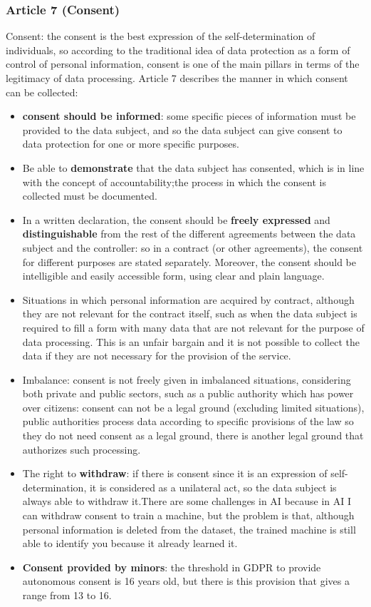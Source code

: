 \subsubsection{Article 7 (Consent)}
Consent: the consent is the best expression of the self-determination of individuals, so according to the traditional idea of data protection as a form of control of personal information, consent is one of the main pillars in terms of the legitimacy of data processing.
Article 7 describes the manner in which consent can be collected:
\begin{itemize}
    \item \textbf{consent should be informed}: some specific pieces of information must be provided to the data subject, and so the data subject can give consent to data protection for one or more specific purposes.
    \item Be able to \textbf{demonstrate} that the data subject has consented, which is in line with the concept of accountability;the process in which the consent is collected must be documented.
    \item In a written declaration, the consent should be \textbf{freely expressed} and \textbf{distinguishable} from the rest of the different agreements between the data subject and the controller: so in a contract (or other agreements), the consent for different purposes are stated separately. Moreover, the consent should be intelligible and easily accessible form, using clear and plain language.
    \item  Situations in which personal information are acquired by contract, although they are not relevant for the contract itself, such as when the data subject is required to fill a form with many data that are not relevant for the purpose of data processing. This is an unfair bargain and it is not possible to collect the data if they are not necessary for the provision of the service.
    \item Imbalance: consent is not freely given in imbalanced situations, considering both private and public sectors, such as a public authority which has power over citizens: consent can not be a legal ground (excluding limited situations), public authorities process data according to specific provisions of the law so they do not need consent as a legal ground, there is another legal ground that authorizes such processing.
    \item The right to \textbf{withdraw}: if there is consent since it is an expression of self-determination, it is considered as a unilateral act, so the data subject is always able to withdraw it.There are some challenges in AI because in AI I can withdraw consent to train a machine, but the problem is that, although personal information is deleted from the dataset, the trained machine is still able to identify you because it already learned it.
    \item \textbf{Consent provided by minors}: the threshold in GDPR to provide autonomous consent is 16 years old, but there is this provision that gives a range from 13 to 16.
\end{itemize}

